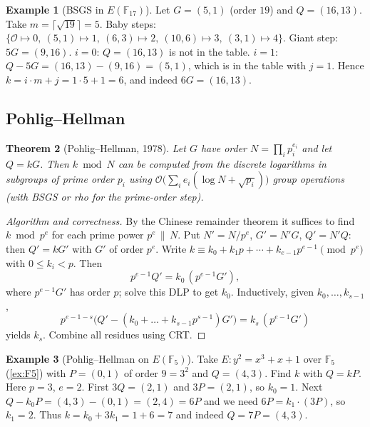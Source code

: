 \documentclass[11pt,a4paper,oneside]{book}
\theoremstyle{plain}
\newtheorem{theorem}{Theorem}[chapter]
\theoremstyle{definition}
\newtheorem{example}[theorem]{Example}
\theoremstyle{remark}
\newcommand{\F}{\mathbb{F}}
\newcommand{\Oinf}{\mathcal{O}}
\newcommand{\bigO}{\mathcal{O}}
\begin{document}
\begin{example}[BSGS in $E(\F_{17})$]
Let $G=(5,1)$ (order $19$) and $Q=(16,13)$. Take $m=\lceil\sqrt{19}\rceil=5$.
Baby steps: $\{\Oinf\mapsto0,\ (5,1)\mapsto1,\ (6,3)\mapsto2,\ (10,6)\mapsto3,\ (3,1)\mapsto4\}$. Giant step: $5G=(9,16)$.
$i=0$: $Q=(16,13)$ is not in the table. $i=1$: $Q-5G=(16,13)-(9,16)=(5,1)$, which is in the table with $j=1$. Hence $k=i\cdot m+j=1\cdot5+1=6$, and indeed $6G=(16,13)$.
\end{example}

\subsection{Pohlig--Hellman}

\begin{theorem}[Pohlig--Hellman, 1978]\label{thm:PH}
Let $G$ have order $N=\prod_{i}p_i^{e_i}$ and let $Q=kG$. Then $k\bmod N$ can be computed from the discrete logarithms in subgroups of prime order $p_i$ using $\bigO\big(\sum_ie_i(\log N+\sqrt{p_i})\big)$ group operations (with BSGS or rho for the prime-order step).
\end{theorem}
\begin{proof}[Algorithm and correctness]
By the Chinese remainder theorem it suffices to find $k\bmod p^e$ for each prime power $p^e\,\|\,N$. Put $N'=N/p^e$, $G'=N'G$, $Q'=N'Q$: then $Q'=kG'$ with $G'$ of order $p^e$. Write $k\equiv k_0+k_1p+\cdots+k_{e-1}p^{e-1}\pmod{p^e}$ with $0\le k_i<p$. Then
\[
p^{e-1}Q'=k_0\,(p^{e-1}G'),
\]
where $p^{e-1}G'$ has order $p$; solve this DLP to get $k_0$. Inductively, given $k_0,\dots,k_{s-1}$,
\[
p^{e-1-s}\big(Q'-(k_0+\dots+k_{s-1}p^{s-1})G'\big)=k_s\,(p^{e-1}G')
\]
yields $k_s$. Combine all residues using CRT.
\end{proof}

\begin{example}[Pohlig--Hellman on $E(\F_5)$]
Take $E:y^2=x^3+x+1$ over $\F_5$ (\cref{ex:F5}) with $P=(0,1)$ of order $9=3^2$ and $Q=(4,3)$. Find $k$ with $Q=kP$.
Here $p=3$, $e=2$. First $3Q=(2,1)$ and $3P=(2,1)$, so $k_0=1$. Next $Q-k_0P=(4,3)-(0,1)=(2,4)=6P$ and we need $6P=k_1\cdot(3P)$, so $k_1=2$. Thus $k=k_0+3k_1=1+6=7$ and indeed $Q=7P=(4,3)$.
\end{example}
\end{document}
